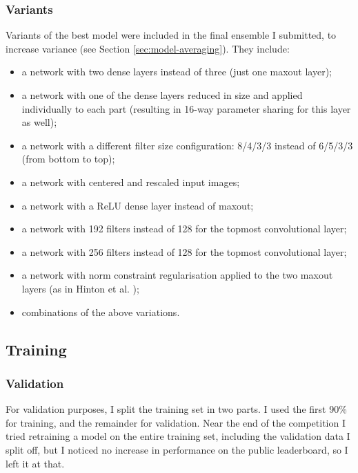 \documentclass[a4paper,10pt]{article}
\begin{document}
\subsubsection{Variants}
\label{sec:variants}

Variants of the best model were included in the final ensemble I submitted, to increase variance (see Section \ref{sec:model-averaging}). They include:

\begin{itemize}
 \item a network with two dense layers instead of three (just one maxout layer);
 \item a network with one of the dense layers reduced in size and applied individually to each part (resulting in 16-way parameter sharing for this layer as well);
 \item a network with a different filter size configuration: 8/4/3/3 instead of 6/5/3/3 (from bottom to top);
 \item a network with centered and rescaled input images;
 \item a network with a ReLU dense layer instead of maxout;
 \item a network with 192 filters instead of 128 for the topmost convolutional layer;
 \item a network with 256 filters instead of 128 for the topmost convolutional layer;
 \item a network with norm constraint regularisation applied to the two maxout layers (as in Hinton et al. \cite{Hinton2012});
 \item combinations of the above variations.
\end{itemize}

\subsection{Training}

\subsubsection{Validation}

For validation purposes, I split the training set in two parts. I used the first 90\% for training, and the remainder for validation. Near the end of the competition I tried retraining a model on the entire training set, including the validation data I split off, but I noticed no increase in performance on the public leaderboard, so I left it at that.
\end{document}
